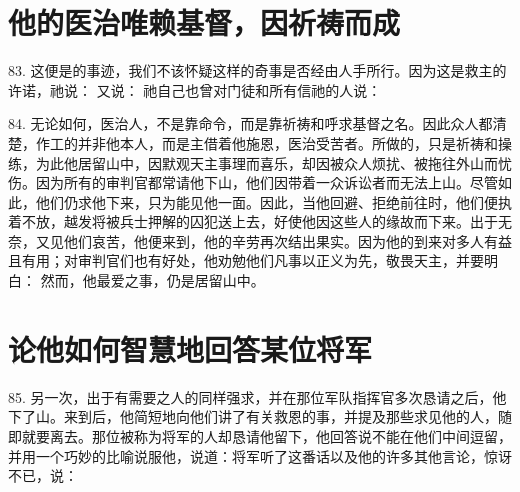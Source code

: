 
\section{他的医治唯赖基督，因祈祷而成}

83. 这便是的事迹，我们不该怀疑这样的奇事是否经由人手所行。因为这是救主的许诺，祂说：  又说：  祂自己也曾对门徒和所有信祂的人说： \par

84. 无论如何，医治人，不是靠命令，而是靠祈祷和呼求基督之名。因此众人都清楚，作工的并非他本人，而是主借着他施恩，医治受苦者。所做的，只是祈祷和操练，为此他居留山中，因默观天主事理而喜乐，却因被众人烦扰、被拖往外山而忧伤。因为所有的审判官都常请他下山，他们因带着一众诉讼者而无法上山。尽管如此，他们仍求他下来，只为能见他一面。因此，当他回避、拒绝前往时，他们便执着不放，越发将被兵士押解的囚犯送上去，好使他因这些人的缘故而下来。出于无奈，又见他们哀苦，他便来到，他的辛劳再次结出果实。因为他的到来对多人有益且有用；对审判官们也有好处，他劝勉他们凡事以正义为先，敬畏天主，并要明白：  然而，他最爱之事，仍是居留山中。\par


\section{论他如何智慧地回答某位将军}

85. 另一次，出于有需要之人的同样强求，并在那位军队指挥官多次恳请之后，他下了山。来到后，他简短地向他们讲了有关救恩的事，并提及那些求见他的人，随即就要离去。那位被称为将军的人却恳请他留下，他回答说不能在他们中间逗留，并用一个巧妙的比喻说服他，说道：将军听了这番话以及他的许多其他言论，惊讶不已，说：\par

